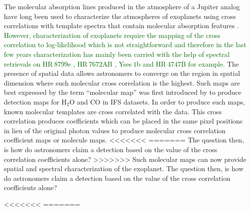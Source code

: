 \documentclass{aa}
\newcommand{\newchange}[1]{\textcolor{darkgreen}{#1}}
\begin{document}
{The molecular absorption lines produced in the atmosphere of a Jupiter analog have long been used to characterize the atmospheres of exoplanets using cross correlations with template spectra \cite[e.g][]{birkby2013detection,snellen2010orbital} that contain molecular absorption features \citep[e.g][]{2003BTsettl}.
\newchange{However, characterization of exoplanets require the mapping of the cross correlation to log-likelihood which is not straightforward and therefore in the last few years characterization has mainly been carried with the help of spectral retrievals on HR$~8799$e \citep[][]{2020MolliereHR8799e}, HR$~7672$AB \citep[][]{2022WangHR7672AB}, Yses$~1$b \citep[][]{2022Zhang} and HR$~4747$B \citep[][]{2022Xuan4747B} for example.}
The presence of spatial data allows astronomers to converge on the region in spatial dimension where such molecular cross correlation is the highest.
Such maps are best expressed by the term ``molecular map'' was first introduced by \citet{2018AHoeijmakersMM} to produce detection maps for \rm{H$_2$O} and \rm{CO} in IFS datasets.
In order to produce such maps, known molecular templates are cross correlated with the data.
This cross correlation produces coefficients which can be placed in the same pixel positions in lieu of the original photon values to produce molecular cross correlation coefficient maps or molecule maps.
<<<<<<<
=======
The question then, is how do astronomers claim a detection based on the value of the cross correlation coefficients alone?
>>>>>>>
Such molecular maps can now provide spatial and spectral characterization of the exoplanet.
The question then, is how do astronomers claim a detection based on the value of the cross correlation coefficients alone?

<<<<<<<
=======

}
\end{document}
